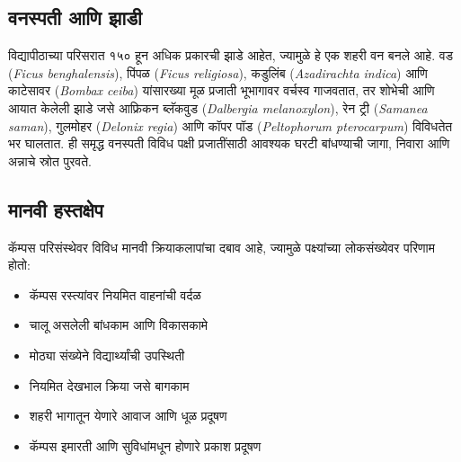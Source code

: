 \documentclass[a4paper,12pt,landscape]{memoir}
\newcommand{\introsection}[2]{%
  \begin{minipage}[t]{0.48\textwidth}
    \begin{mdframed}[
      linecolor=headingcolor,
      linewidth=1pt,
      roundcorner=5pt,
      leftmargin=0pt,
      rightmargin=0pt,
      backgroundcolor=headingcolor!5
    ]
      #1
    \end{mdframed}
  \end{minipage}\hfill
  \begin{minipage}[t]{0.48\textwidth}
    \begin{mdframed}[
      linecolor=headingcolor,
      linewidth=1pt,
      roundcorner=5pt,
      leftmargin=0pt,
      rightmargin=0pt,
      backgroundcolor=headingcolor!5
    ]
      #2
    \end{mdframed}
  \end{minipage}
  \newpage
}
\begin{document}
\introsection{%
  \section*{वनस्पती आणि झाडी}
  विद्यापीठाच्या परिसरात १५० हून अधिक प्रकारची झाडे आहेत, ज्यामुळे हे एक शहरी वन बनले आहे. 
  वड ({\latintext \textit{Ficus benghalensis}}), पिंपळ ({\latintext \textit{Ficus religiosa}}), 
  कडुलिंब ({\latintext\textit{Azadirachta indica}}) आणि काटेसावर  ({\latintext \textit{Bombax ceiba}}) 
  यांसारख्या मूळ प्रजाती भूभागावर वर्चस्व गाजवतात, तर शोभेची आणि आयात केलेली झाडे जसे आफ्रिकन ब्लॅकवुड 
  ({\latintext \textit{Dalbergia melanoxylon}}), रेन ट्री ({\latintext{}\textit{Samanea saman}}), गुलमोहर ({\latintext\textit{Delonix regia}}) 
  आणि कॉपर पॉड ({\latintext \textit{Peltophorum pterocarpum}}) विविधतेत भर घालतात. ही समृद्ध वनस्पती विविध पक्षी प्रजातींसाठी आवश्यक घरटी बांधण्याची जागा, 
  निवारा आणि अन्नाचे स्रोत पुरवते.
}{%
  \section*{मानवी हस्तक्षेप}
  कॅम्पस परिसंस्थेवर विविध मानवी क्रियाकलापांचा दबाव आहे, ज्यामुळे पक्ष्यांच्या लोकसंख्येवर परिणाम होतो:
  \begin{itemize}
  \item कॅम्पस रस्त्यांवर नियमित वाहनांची वर्दळ
  \item चालू असलेली बांधकाम आणि विकासकामे
  \item मोठ्या संख्येने विद्यार्थ्यांची उपस्थिती
  \item नियमित देखभाल क्रिया जसे बागकाम
  \item शहरी भागातून येणारे आवाज आणि धूळ प्रदूषण
  \item कॅम्पस इमारती आणि सुविधांमधून होणारे प्रकाश प्रदूषण
  \end{itemize}
}
\end{document}
